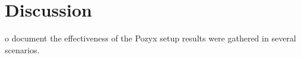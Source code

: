 \chapter{Discussion}\label{ch:discussion}
o document the effectiveness of the Pozyx setup results were gathered in several scenarios.
\lipsum[2-8]